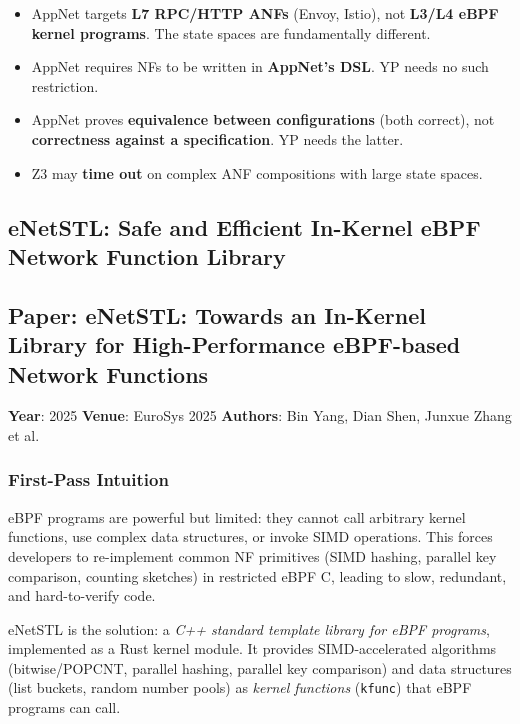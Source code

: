 \begin{limitbox}
\begin{itemize}
  \item AppNet targets \textbf{L7 RPC/HTTP ANFs} (Envoy, Istio), not \textbf{L3/L4 eBPF kernel programs}. The state spaces are fundamentally different.
  \item AppNet requires NFs to be written in \textbf{AppNet's DSL}. YP needs no such restriction.
  \item AppNet proves \textbf{equivalence between configurations} (both correct), not \textbf{correctness against a specification}. YP needs the latter.
  \item Z3 may \textbf{time out} on complex ANF compositions with large state spaces.
\end{itemize}
\end{limitbox}

\subsection{eNetSTL: Safe and Efficient In-Kernel eBPF Network Function Library}

\subsection*{Paper: eNetSTL: Towards an In-Kernel Library for High-Performance eBPF-based Network Functions}
\textbf{Year}: 2025 \quad \textbf{Venue}: EuroSys 2025 \quad \textbf{Authors}: Bin Yang, Dian Shen, Junxue Zhang et al.

\subsubsection{First-Pass Intuition}

eBPF programs are powerful but limited: they cannot call arbitrary kernel functions, use complex data structures, or invoke SIMD operations. This forces developers to re-implement common NF primitives (SIMD hashing, parallel key comparison, counting sketches) in restricted eBPF C, leading to slow, redundant, and hard-to-verify code.

eNetSTL is the solution: a \emph{C++ standard template library for eBPF programs}, implemented as a Rust kernel module. It provides SIMD-accelerated algorithms (bitwise/POPCNT, parallel hashing, parallel key comparison) and data structures (list buckets, random number pools) as \emph{kernel functions} (\texttt{kfunc}) that eBPF programs can call.

